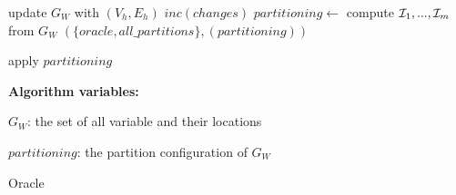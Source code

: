 \begin{algorithm}[t!]
\begin{distribalgo}[1]
\vspace{1.0mm}

	\STATE update $G_W$ with $(V_h,E_h)$
	\STATE $inc(changes)$
		\STATE $partitioning  \leftarrow$ compute $\mathcal{I}_1, ..., \mathcal{I}_m$ from $G_W$
		\STATE \amcast$(\{oracle, all\_partitions\}, (partitioning))$
	\ENDIF
\ENDINDENT

\vspace{1.0mm}

	\STATE apply $partitioning$
\ENDINDENT

\vspace{1.5mm}

\textbf{Algorithm variables:}

\vspace{1mm}

$G_W$: the set of all variable and their locations

$partitioning$: the partition configuration of $G_W$


\caption{Oracle}
\label{alg:oracle_proxy}
\end{distribalgo}
\end{algorithm}



